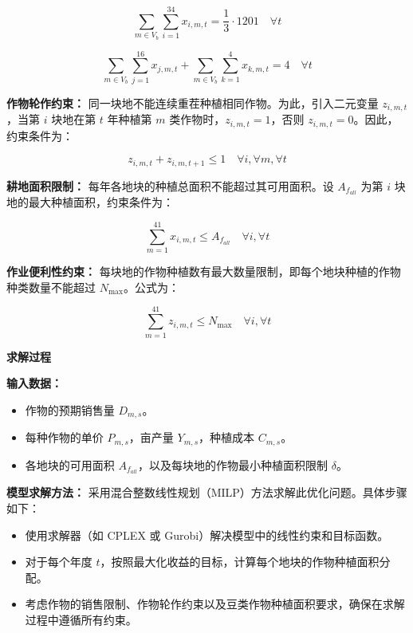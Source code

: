 \begin{equation}
\sum_{m \in V_b} \sum_{i=1}^{34} x_{i,m,t} = \frac{1}{3} \cdot 1201 \quad \forall t
\end{equation}

\begin{equation}
\sum_{m \in V_b} \sum_{j=1}^{16} x_{j,m,t} + \sum_{m \in V_b} \sum_{k=1}^{4} x_{k,m,t} = 4 \quad \forall t
\end{equation}

\textbf{作物轮作约束：}  
同一块地不能连续重茬种植相同作物。为此，引入二元变量 $z_{i,m,t}$，当第 $i$ 块地在第 $t$ 年种植第 $m$ 类作物时，$z_{i,m,t} = 1$，否则 $z_{i,m,t} = 0$。因此，约束条件为：

\begin{equation}
z_{i,m,t} + z_{i,m,t+1} \leq 1 \quad \forall i, \forall m, \forall t
\end{equation}

\textbf{耕地面积限制：}  
每年各地块的种植总面积不能超过其可用面积。设 $A_{f_{all}}$ 为第 $i$ 块地的最大种植面积，约束条件为：

\begin{equation}
\sum_{m=1}^{41} x_{i,m,t} \leq A_{f_{all}} \quad \forall i, \forall t
\end{equation}

\textbf{作业便利性约束：}  
每块地的作物种植数有最大数量限制，即每个地块种植的作物种类数量不能超过 $N_{\text{max}}$。公式为：

\begin{equation}
\sum_{m=1}^{41} z_{i,m,t} \leq N_{\text{max}} \quad \forall i, \forall t
\end{equation}

\textbf{求解过程}

\textbf{输入数据：}  
\begin{itemize}
    \item 作物的预期销售量 $D_{m,s}$。
    \item 每种作物的单价 $P_{m,s}$，亩产量 $Y_{m,s}$，种植成本 $C_{m,s}$。
    \item 各地块的可用面积 $A_{f_{all}}$，以及每块地的作物最小种植面积限制 $\delta$。
\end{itemize}

\textbf{模型求解方法：}  
采用混合整数线性规划（MILP）方法求解此优化问题。具体步骤如下：

\begin{itemize}
    \item 使用求解器（如 CPLEX 或 Gurobi）解决模型中的线性约束和目标函数。
    \item 对于每个年度 $t$，按照最大化收益的目标，计算每个地块的作物种植面积分配。
    \item 考虑作物的销售限制、作物轮作约束以及豆类作物种植面积要求，确保在求解过程中遵循所有约束。
\end{itemize}

